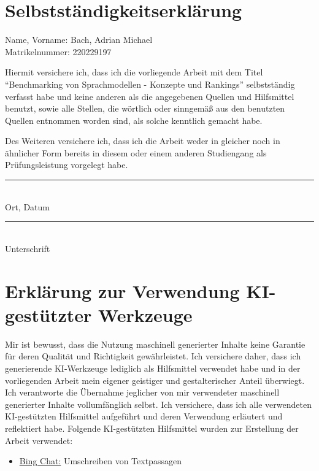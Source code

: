 \section*{Selbstständigkeitserklärung}

Name, Vorname: Bach, Adrian Michael\\
Matrikelnummer: 220229197

\medskip
\noindent Hiermit versichere ich, dass ich die vorliegende Arbeit mit dem Titel \enquote{Benchmarking von Sprachmodellen - Konzepte und Rankings} selbstständig verfasst habe und keine anderen als die angegebenen Quellen und Hilfsmittel benutzt, sowie alle Stellen, die wörtlich oder sinngemäß aus den benutzten Quellen entnommen worden sind, als solche kenntlich gemacht habe.

\medskip
\noindent
Des Weiteren versichere ich, dass ich die Arbeit weder in gleicher noch in ähnlicher Form bereits in diesem oder einem anderen Studiengang als Prüfungsleistung vorgelegt habe.

\vspace{3cm}
\parbox{4.5cm}{
    \rule{3.5cm}{1pt}\\
    \centering Ort, Datum
}\hfill
\parbox{4.5cm}{
    \rule{3.5cm}{1pt}\\
    \centering Unterschrift
}

\newpage
\section*{Erklärung zur Verwendung KI-gestützter Werkzeuge}
Mir ist bewusst, dass die Nutzung maschinell generierter Inhalte keine Garantie für deren
Qualität und Richtigkeit gewährleistet. 
Ich versichere daher, dass ich generierende KI-Werkzeuge lediglich als Hilfsmittel verwendet habe und in der vorliegenden Arbeit mein eigener geistiger und gestalterischer Anteil überwiegt.
Ich verantworte die Übernahme jeglicher von mir verwendeter maschinell generierter Inhalte
vollumfänglich selbst. 
Ich versichere, dass ich alle verwendeten KI-gestützten Hilfsmittel
aufgeführt und deren Verwendung erläutert und reflektiert habe.
Folgende KI-gestützten Hilfsmittel wurden zur Erstellung der Arbeit verwendet:
\begin{itemize}
    \item \href{http://www.bing.com/chat}{Bing Chat:} Umschreiben von Textpassagen
\end{itemize}
